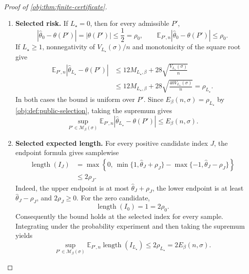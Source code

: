 \begin{proof}[Proof of \cref{obj:thm:finite-certificate}]
\begin{enumerate}
\item \textbf{Selected risk.}
If \(L_\star=0\), then for every admissible \(P'\),
\[
|\widehat\theta_0-\theta(P')|
=|\theta(P')|\le\frac12=\rho_0,
\qquad
\mathbb E_{P',n}|\widehat\theta_0-\theta(P')|\le\rho_0.
\]
If \(L_\star\ge1\), nonnegativity of \(V_{L_\star}(\sigma)/n\) and monotonicity of the square root give
\[
\begin{aligned}
\mathbb E_{P',n}|\widehat\theta_{L_\star}-\theta(P')|
&\le12M_{L_\star,\beta}
+28\sqrt{\frac{V_{L_\star}(\sigma)}n}\\
&\le12M_{L_\star,\beta}
+28\sqrt{\frac{40V_{L_\star}(\sigma)}n}
=\rho_{L_\star}.
\end{aligned}
\]
In both cases the bound is uniform over \(P'\). Since
\(E_\beta(n,\sigma)=\rho_{L_\star}\) by
\cref{obj:def:public-selection}, taking the supremum gives
\[
\sup_{P'\in\mathcal M_\beta(\sigma)}
\mathbb E_{P',n}|\widehat\theta_{L_\star}-\theta(P')|
\le E_\beta(n,\sigma).
\]

\item \textbf{Selected expected length.}
For every positive candidate index \(J\), the endpoint formula gives samplewise
\[
\begin{aligned}
\operatorname{length}(I_J)
&=\max\!\left\{0,\,
\min\{1,\widehat\theta_J+\rho_J\}
-\max\{-1,\widehat\theta_J-\rho_J\}\right\}\\
&\le2\rho_J.
\end{aligned}
\]
Indeed, the upper endpoint is at most
\(\widehat\theta_J+\rho_J\), the lower endpoint is at least
\(\widehat\theta_J-\rho_J\), and \(2\rho_J\ge0\).
For the zero candidate,
\[
\operatorname{length}(I_0)=1=2\rho_0.
\]
Consequently the bound holds at the selected index for every sample. Integrating under the probability experiment and then taking the supremum yields
\[
\sup_{P'\in\mathcal M_\beta(\sigma)}
\mathbb E_{P',n}\operatorname{length}(I_{L_\star})
\le2\rho_{L_\star}
=2E_\beta(n,\sigma).
\]
\end{enumerate}
\end{proof}

